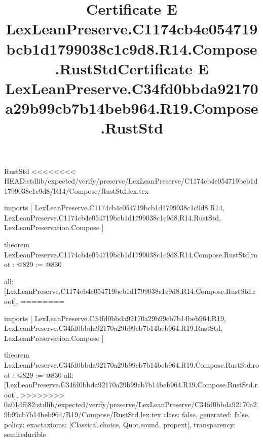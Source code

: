 \begin{lexlean}{RustStd}
<<<<<<<< HEAD:stdlib/expected/verify/preserve/LexLeanPreserve/C1174cb4e054719bcb1d1799038c1c9d8/R14/Compose/RustStd.lex.tex
\title{Certificate E LexLeanPreserve.C1174cb4e054719bcb1d1799038c1c9d8.R14.Compose.RustStd}
\begin{coremodule}
imports [
  LexLeanPreserve.C1174cb4e054719bcb1d1799038c1c9d8.R14,
  LexLeanPreserve.C1174cb4e054719bcb1d1799038c1c9d8.R14.RustStd,
  LexLeanPreservation.Compose
]

theorem LexLeanPreserve.C1174cb4e054719bcb1d1799038c1c9d8.R14.Compose.RustStd.root : @829 := @830 {
  all: [LexLeanPreserve.C1174cb4e054719bcb1d1799038c1c9d8.R14.Compose.RustStd.root],
========
\title{Certificate E LexLeanPreserve.C34fd0bbda92170a29b99cb7b14beb964.R19.Compose.RustStd}
\begin{coremodule}
imports [
  LexLeanPreserve.C34fd0bbda92170a29b99cb7b14beb964.R19,
  LexLeanPreserve.C34fd0bbda92170a29b99cb7b14beb964.R19.RustStd,
  LexLeanPreservation.Compose
]

theorem LexLeanPreserve.C34fd0bbda92170a29b99cb7b14beb964.R19.Compose.RustStd.root : @829 := @830 {
  all: [LexLeanPreserve.C34fd0bbda92170a29b99cb7b14beb964.R19.Compose.RustStd.root],
>>>>>>>> 0a01df682:stdlib/expected/verify/preserve/LexLeanPreserve/C34fd0bbda92170a29b99cb7b14beb964/R19/Compose/RustStd.lex.tex
  class: false,
  generated: false,
  policy: exact{axioms: [Classical.choice, Quot.sound, propext]},
  transparency: semireducible
}


\end{coremodule}}
\end{coremodule}
\end{lexlean}
